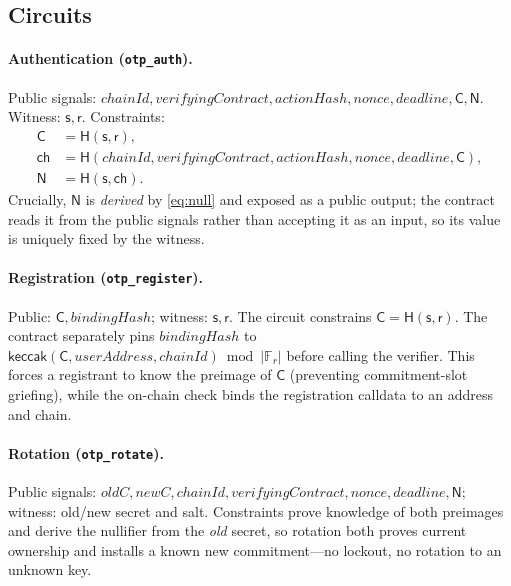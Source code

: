 \documentclass[11pt]{article}
\theoremstyle{definition}
\theoremstyle{plain}
\newcommand{\Hash}{\mathsf{H}}       %
\newcommand{\keccak}{\mathsf{keccak}}
\newcommand{\Fr}{\mathbb{F}_r}       %
\newcommand{\secret}{\mathsf{s}}
\newcommand{\salt}{\mathsf{r}}
\newcommand{\commit}{\mathsf{C}}
\newcommand{\chal}{\mathsf{ch}}
\newcommand{\nul}{\mathsf{N}}
\begin{document}
\subsection{Circuits}
\label{sec:circuits}

\paragraph{Authentication (\texttt{otp\_auth}).}
Public signals: $\mathit{chainId}, \mathit{verifyingContract}, \mathit{actionHash},
\mathit{nonce}, \mathit{deadline}, \commit, \nul$. Witness: $\secret, \salt$.
Constraints:
\begin{align}
  \commit &= \Hash(\secret, \salt), \label{eq:commit}\\
  \chal   &= \Hash(\mathit{chainId}, \mathit{verifyingContract}, \mathit{actionHash},
              \mathit{nonce}, \mathit{deadline}, \commit), \label{eq:chal}\\
  \nul    &= \Hash(\secret, \chal). \label{eq:null}
\end{align}
Crucially, $\nul$ is \emph{derived} by \eqref{eq:null} and exposed as a public
output; the contract reads it from the public signals rather than accepting it as an
input, so its value is uniquely fixed by the witness.

\paragraph{Registration (\texttt{otp\_register}).}
Public: $\commit, \mathit{bindingHash}$; witness: $\secret, \salt$. The circuit
constrains $\commit = \Hash(\secret, \salt)$. The contract separately pins
$\mathit{bindingHash}$ to
$\keccak(\commit, \mathit{userAddress}, \mathit{chainId}) \bmod |\Fr|$ before
calling the verifier. This forces a registrant to know the preimage of $\commit$
(preventing commitment-slot griefing), while the on-chain check binds the
registration calldata to an address and chain.

\paragraph{Rotation (\texttt{otp\_rotate}).}
Public signals: $\mathit{oldC}, \mathit{newC}, \mathit{chainId}, \mathit{verifyingContract},
\mathit{nonce}, \mathit{deadline}, \nul$; witness: old/new secret and salt.
Constraints prove knowledge of both preimages and derive the nullifier from the
\emph{old} secret, so rotation both proves current ownership and installs a
known new commitment---no lockout, no rotation to an unknown key.
\end{document}
